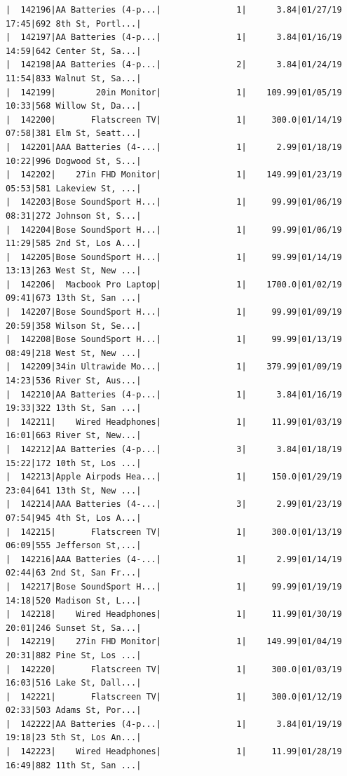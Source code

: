 \documentclass[
  letterpaper,
  DIV=11,
  numbers=noendperiod]{scrartcl}
\begin{document}
\begin{verbatim}
|  142196|AA Batteries (4-p...|               1|      3.84|01/27/19 17:45|692 8th St, Portl...|
|  142197|AA Batteries (4-p...|               1|      3.84|01/16/19 14:59|642 Center St, Sa...|
|  142198|AA Batteries (4-p...|               2|      3.84|01/24/19 11:54|833 Walnut St, Sa...|
|  142199|        20in Monitor|               1|    109.99|01/05/19 10:33|568 Willow St, Da...|
|  142200|       Flatscreen TV|               1|     300.0|01/14/19 07:58|381 Elm St, Seatt...|
|  142201|AAA Batteries (4-...|               1|      2.99|01/18/19 10:22|996 Dogwood St, S...|
|  142202|    27in FHD Monitor|               1|    149.99|01/23/19 05:53|581 Lakeview St, ...|
|  142203|Bose SoundSport H...|               1|     99.99|01/06/19 08:31|272 Johnson St, S...|
|  142204|Bose SoundSport H...|               1|     99.99|01/06/19 11:29|585 2nd St, Los A...|
|  142205|Bose SoundSport H...|               1|     99.99|01/14/19 13:13|263 West St, New ...|
|  142206|  Macbook Pro Laptop|               1|    1700.0|01/02/19 09:41|673 13th St, San ...|
|  142207|Bose SoundSport H...|               1|     99.99|01/09/19 20:59|358 Wilson St, Se...|
|  142208|Bose SoundSport H...|               1|     99.99|01/13/19 08:49|218 West St, New ...|
|  142209|34in Ultrawide Mo...|               1|    379.99|01/09/19 14:23|536 River St, Aus...|
|  142210|AA Batteries (4-p...|               1|      3.84|01/16/19 19:33|322 13th St, San ...|
|  142211|    Wired Headphones|               1|     11.99|01/03/19 16:01|663 River St, New...|
|  142212|AA Batteries (4-p...|               3|      3.84|01/18/19 15:22|172 10th St, Los ...|
|  142213|Apple Airpods Hea...|               1|     150.0|01/29/19 23:04|641 13th St, New ...|
|  142214|AAA Batteries (4-...|               3|      2.99|01/23/19 07:54|945 4th St, Los A...|
|  142215|       Flatscreen TV|               1|     300.0|01/13/19 06:09|555 Jefferson St,...|
|  142216|AAA Batteries (4-...|               1|      2.99|01/14/19 02:44|63 2nd St, San Fr...|
|  142217|Bose SoundSport H...|               1|     99.99|01/19/19 14:18|520 Madison St, L...|
|  142218|    Wired Headphones|               1|     11.99|01/30/19 20:01|246 Sunset St, Sa...|
|  142219|    27in FHD Monitor|               1|    149.99|01/04/19 20:31|882 Pine St, Los ...|
|  142220|       Flatscreen TV|               1|     300.0|01/03/19 16:03|516 Lake St, Dall...|
|  142221|       Flatscreen TV|               1|     300.0|01/12/19 02:33|503 Adams St, Por...|
|  142222|AA Batteries (4-p...|               1|      3.84|01/19/19 19:18|23 5th St, Los An...|
|  142223|    Wired Headphones|               1|     11.99|01/28/19 16:49|882 11th St, San ...|

\end{verbatim}
\end{document}
